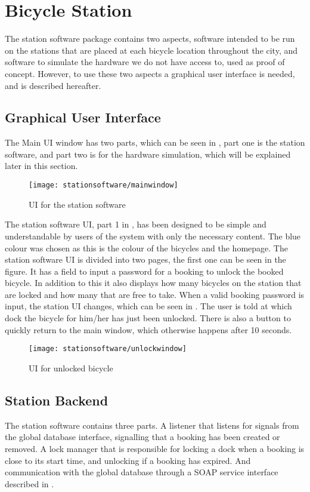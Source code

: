 \section{Bicycle Station}
The station software package contains two aspects, software intended to be run on the stations that are placed at each bicycle location throughout the city, and software to simulate the hardware we do not have access to, used as proof of concept. 
However, to use these two aspects a graphical user interface is needed, and is described hereafter.

\subsection{Graphical User Interface}
The Main UI window has two parts, which can be seen in , part one is the station software, and part two is for the hardware simulation, which will be explained later in this section.

\begin{figure}[h]
	\centering
	\texttt{[image: stationsoftware/mainwindow]}
	\caption{UI for the station software}\label{fig:stationMain}
\end{figure}

The station software UI, part 1 in , has been designed to be simple and understandable by users of the system with only the necessary content.
The blue colour was chosen as this is the colour of the bicycles and the \bycykel homepage.
The station software UI is divided into two pages, the first one can be seen in the figure.
It has a field to input a password for a booking to unlock the booked bicycle.
In addition to this it also displays how many bicycles on the station that are locked and how many that are free to take.
When a valid booking password is input, the station UI changes, which can be seen in .
The user is told at which dock the bicycle for him/her has just been unlocked.
There is also a button to quickly return to the main window, which otherwise happens after 10 seconds.

\begin{figure}[h]
	\centering
	\texttt{[image: stationsoftware/unlockwindow]}
	\caption{UI for unlocked bicycle}\label{fig:bicycleUnlock}
\end{figure}


\subsection{Station Backend}
The station software contains three parts.
A listener that listens for signals from the global database interface, signalling that a booking has been created or removed.
A lock manager that is responsible for locking a dock when a booking is close to its start time, and unlocking if a booking has expired.
And communication with the global database through a SOAP service interface described in .

